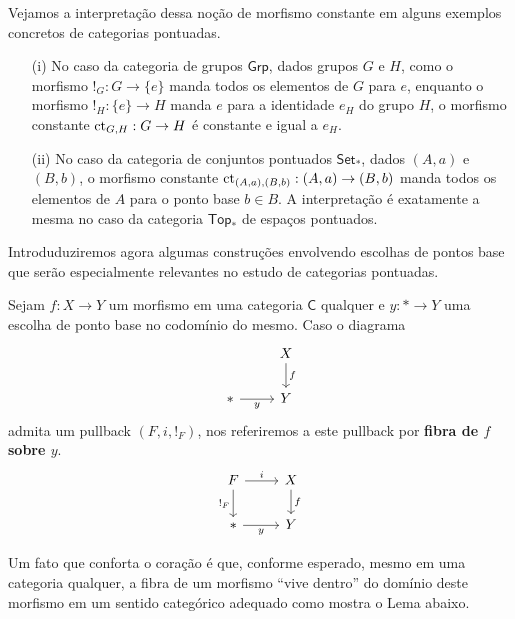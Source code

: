 \begin{exem}
  Vejamos a interpretação dessa noção de morfismo constante em alguns exemplos concretos de categorias pontuadas.

  \begin{enumerate}
  \item[(i)] No caso da categoria de grupos $\mathsf{Grp}$, dados grupos $G$ e $H$, como o morfismo $!_{G}: G \to \{e\}$ manda todos os elementos de $G$ para $e$, enquanto o morfismo $!_{H}: \{e\} \to H$ manda $e$ para a identidade $e_{H}$ do grupo $H$, o morfismo constante $\mathrm{ct}_{G,H}: G \to H$ é constante e igual a $e_{H}$.

  \item[(ii)] No caso da categoria de conjuntos pontuados $\mathsf{Set_{*}}$, dados $(A,a)$ e $(B,b)$, o morfismo constante $\mathrm{ct}_{(A,a),(B,b)}: (A,a) \to (B,b)$ manda todos os elementos de $A$ para o ponto base $b \in B$.
    A interpretação é exatamente a mesma no caso da categoria $\mathsf{Top_{*}}$ de espaços pontuados.
  \end{enumerate}
\end{exem}

Introduduziremos agora algumas construções envolvendo escolhas de pontos base que serão especialmente relevantes no estudo de categorias pontuadas.

\begin{defin}\label{defin:fibra_sobre_ponto_base}
  Sejam $f: X \to Y$ um morfismo em uma categoria $\mathsf{C}$ qualquer e $y: * \to Y$ uma escolha de ponto base no codomínio do mesmo.
  Caso o diagrama
  \begin{displaymath}
    \begin{tikzcd}
      & X
      \arrow[d, "f"]
      \\ *
      \arrow[r, "y" swap]
      & Y
    \end{tikzcd}
  \end{displaymath}
  admita um pullback $(F,i,!_{F})$, nos referiremos a este pullback por \textbf{fibra de $f$ sobre $y$}.
  \begin{displaymath}
    \begin{tikzcd}
      F
      \arrow[r, "i"]
      \arrow[d, "!_{F}" swap]
      & X
      \arrow[d, "f"]
      \\ *
      \arrow[r, "y" swap]
      & Y
    \end{tikzcd}
  \end{displaymath}
\end{defin}

Um fato que conforta o coração é que, conforme esperado, mesmo em uma categoria qualquer, a fibra de um morfismo ``vive dentro'' do domínio deste morfismo em um sentido categórico adequado como mostra o Lema abaixo.

